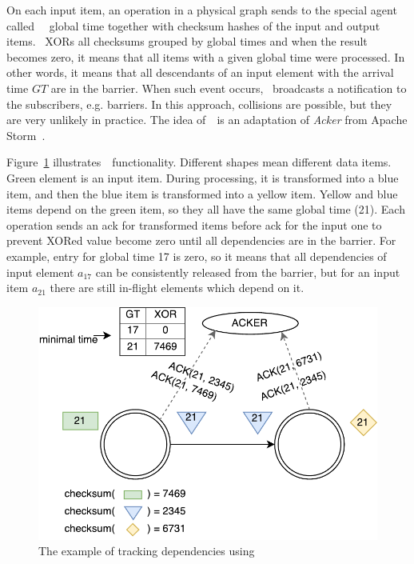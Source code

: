 On each input item, an operation in a physical graph sends to the special agent called~{\em \Acker\ } global time together with checksum hashes of the input and output items. \Acker\ XORs all checksums grouped by global times and when the result becomes zero, it means that all items with a given global time were processed. In other words, it means that all descendants of an input element with the arrival time $GT$ are in the barrier. When such event occurs, \Acker\ broadcasts a notification to the subscribers, e.g. barriers. In this approach, collisions are possible, but they are very unlikely in practice. The idea of~\Acker\ is an adaptation of {\em Acker} from Apache Storm~\cite{apache:storm}.

Figure~\ref{acker} illustrates~\Acker\ functionality. Different shapes mean different data items. Green element is an input item. During processing, it is transformed into a blue item, and then the blue item is transformed into a yellow item. Yellow and blue items depend on the green item, so they all have the same global time (21). Each operation sends an ack for transformed items before ack for the input one to prevent XORed value become zero until all dependencies are in the barrier. For example, entry for global time 17 is zero, so it means that all dependencies of input element $a_{17}$ can be consistently released from the barrier, but for an input item $a_{21}$ there are still in-flight elements which depend on it.

\begin{figure}[htbp]
  \centering
  \includegraphics[scale=0.58]{pics/acker}
  \caption{The example of tracking dependencies using~\Acker\ }
  \label {acker}
\end{figure}

